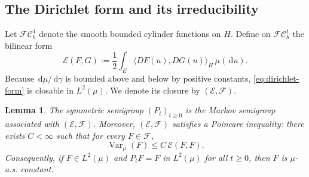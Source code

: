 \documentclass[12pt]{article}
\numberwithin{equation}{section}
\newtheorem{lemma}[theorem]{Lemma}
\newcommand{\dd}{\,\mathrm d}
\newcommand{\1}{\mathbf 1}
\newcommand{\cE}{\mathcal E}
\newcommand{\cF}{\mathcal F}
\newcommand{\Var}{\operatorname{Var}}
\begin{document}
\subsection{The Dirichlet form and its irreducibility}

Let $\mathcal{FC}_b^1$ denote the smooth bounded cylinder functions on $H$. Define
on $\mathcal{FC}_b^1$ the bilinear form
\begin{equation}\label{eq:dirichlet-form}
        \cE(F,G)
        :=
        \frac12\int_E \langle DF(u),DG(u)\rangle_H\,\mu(\dd u).
\end{equation}
Because $\dd\mu/\dd\gamma$ is bounded above and below by positive constants,
\eqref{eq:dirichlet-form} is closable in $L^2(\mu)$. We denote its closure by
$(\cE,\cF)$.

\begin{lemma}\label{lem:dirichlet-form}
The symmetric semigroup $(P_t)_{t\geq0}$ is the Markov semigroup associated with
$(\cE,\cF)$. Moreover, $(\cE,\cF)$ satisfies a Poincare inequality: there exists
$C<\infty$ such that for every $F\in\cF$,
\begin{equation}\label{eq:poincare}
        \Var_\mu(F)\leq C\,\cE(F,F).
\end{equation}
Consequently, if $F\in L^2(\mu)$ and $P_tF=F$ in $L^2(\mu)$ for all $t\geq0$, then
$F$ is $\mu$-a.s. constant.
\end{lemma}
\end{document}
